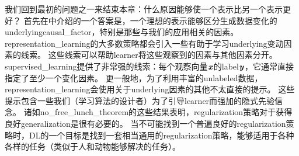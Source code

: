 我们回到最初的问题之一来结束本章：什么原因能够使一个表示比另一个表示更好？
首先在中介绍的一个答案是，一个理想的表示能够区分生成数据变化的\gls{underlying}\gls{causal_factor}，特别是那些与我们的应用相关的因素。
\gls{representation_learning}的大多数策略都会引入一些有助于学习\gls{underlying}变动因素的线索。
这些线索可以帮助\gls{learner}将这些观察到的因素与其他因素分开。
\gls{supervised_learning}提供了非常强的线索：每个观察向量$\boldsymbol{\mathit{x}}$的\gls{label}$\boldsymbol{\mathit{y}}$，它通常直接指定了至少一个变化因素。
更一般地，为了利用丰富的\gls{unlabeled}数据，\gls{representation_learning}会使用关于\gls{underlying}因素的其他不太直接的提示。
这些提示包含一些我们（学习算法的设计者）为了引导\gls{learner}而强加的隐式先验信念。
诸如\gls{no_free_lunch_theorem}的这些结果表明，\gls{regularization}策略对于获得良好\gls{generalization}是很有必要的。
当不可能找到一个普遍良好的\gls{regularization}策略时，\gls{DL}的一个目标是找到一套相当通用的\gls{regularization}策略，能够适用于各种各样的任务（类似于人和动物能够解决的任务）。


